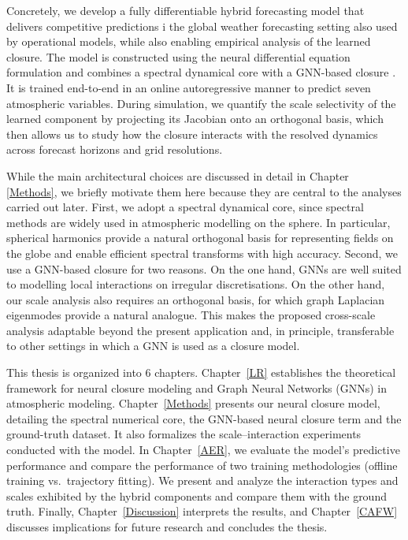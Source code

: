 Concretely, we develop a fully differentiable hybrid forecasting model that delivers competitive predictions i the global weather forecasting setting also used by operational models, while also enabling empirical analysis of the learned closure. The model is constructed using the neural differential equation formulation and combines a spectral dynamical core with a GNN-based closure \cite{neuraldiffeqs2}. It is trained end-to-end in an online autoregressive manner to predict seven atmospheric variables. During simulation, we quantify the scale selectivity of the learned component by projecting its Jacobian onto an orthogonal basis, which then allows us to study how the closure interacts with the resolved dynamics across forecast horizons and grid resolutions.

While the main architectural choices are discussed in detail in Chapter \ref{Methods}, we briefly motivate them here because they are central to the analyses carried out later. First, we adopt a spectral dynamical core, since spectral methods are widely used in atmospheric modelling on the sphere. In particular, spherical harmonics provide a natural orthogonal basis for representing fields on the globe and enable efficient spectral transforms with high accuracy. Second, we use a GNN-based closure for two reasons. On the one hand, GNNs are well suited to modelling local interactions on irregular discretisations. On the other hand, our scale analysis also requires an orthogonal basis, for which graph Laplacian eigenmodes provide a natural analogue. This makes the proposed cross-scale analysis adaptable beyond the present application and, in principle, transferable to other settings in which a GNN is used as a closure model.

This thesis is organized into 6 chapters. Chapter~\ref{LR} establishes the theoretical framework for neural closure modeling and Graph Neural Networks (GNNs) in atmospheric modeling. Chapter~\ref{Methods} presents our neural closure model, detailing the spectral numerical core, the GNN-based neural closure term and the ground-truth dataset. It also formalizes the scale–interaction experiments conducted with the model. In Chapter~\ref{AER}, we evaluate the model’s predictive performance and compare the performance of two training methodologies (offline training vs.\ trajectory fitting). We present and analyze the interaction types and scales exhibited by the hybrid components and compare them with the ground truth. Finally, Chapter~\ref{Discussion} interprets the results, and Chapter~\ref{CAFW} discusses implications for future research and concludes the thesis.
